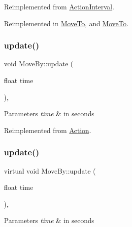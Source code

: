 Reimplemented from \hyperlink{classActionInterval_ad3d91186b2c3108488ddbbdbbd982484}{Action\+Interval}.



Reimplemented in \hyperlink{classMoveTo_a434fce91e656b8f239cef63938fb29a6}{Move\+To}, and \hyperlink{classMoveTo_af9f86e7c5d391fe494cf6a597b839b13}{Move\+To}.

\mbox{\label{classMoveBy_afabf897627fba061a80ab8121840347e}} 
\subsubsection{\texorpdfstring{update()}{update()}\hspace{0.1cm}{\footnotesize\ttfamily [1/2]}}
{\footnotesize\ttfamily void Move\+By\+::update (\begin{DoxyParamCaption}\item[{float}]{time }\end{DoxyParamCaption})\hspace{0.3cm}{\ttfamily [override]}, {\ttfamily [virtual]}}


\begin{DoxyParams}{Parameters}
{\em time} & in seconds \\
\hline
\end{DoxyParams}


Reimplemented from \hyperlink{classAction_a937e646e63915e33ad05ba149bfcf239}{Action}.

\mbox{\label{classMoveBy_aa068073d0de5b7b9e731c44f71362c9b}} 
\subsubsection{\texorpdfstring{update()}{update()}\hspace{0.1cm}{\footnotesize\ttfamily [2/2]}}
{\footnotesize\ttfamily virtual void Move\+By\+::update (\begin{DoxyParamCaption}\item[{float}]{time }\end{DoxyParamCaption})\hspace{0.3cm}{\ttfamily [override]}, {\ttfamily [virtual]}}


\begin{DoxyParams}{Parameters}
{\em time} & in seconds \\
\hline
\end{DoxyParams}


